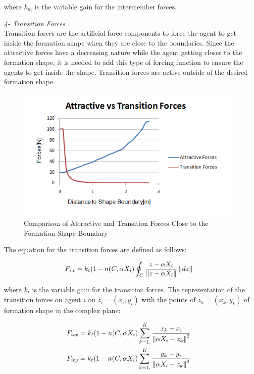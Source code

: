 where $k_m$ is the variable gain for the intermember forces.  \newline
			
\textit{4- Transition Forces} \\ 		
Transition forces are the artificial force components to force the agent to get inside the formation shape when they are close to the boundaries. Since the attractive forces have a decreasing nature while the agent getting closer to the formation shape, it is needed to add this type of forcing function to ensure the agents to get inside the shape. Transition forces are active outside of the desired formation shape.
			
\begin{figure}[H]
\caption{Comparison of Attractive and Transition Forces Close to the Formation Shape Boundary}
\centering
\includegraphics[scale = 0.80]{transition_forces}
\end{figure}		

The equation for the transition forces are defined as follows:	
				
\begin{equation}
F_{i,t} = k_t (1-n(C,\alpha X_i) \oint_C \frac{z-\alpha X_i}{\left\lVert z-\alpha X_i\right\rVert}\left\lVert dz\right\rVert
\end{equation}
				
where $k_t$ is the variable gain for the transition forces. The representation of the transition forces on agent $i$ on $z_i = (x_i, y_i)$ with the points of  $z_k = (x_k,y_k)$ of formation shape in the complex plane:
			
\begin{align}
\begin{split}
&F_{itx} = k_t  (1-n(C,\alpha X_i) \sum_{k=1,}^{K}\frac{x_k- x_i}{\left\lVert\alpha X_i - z_k\right\rVert^3}\\
&F_{ity} = k_t  (1-n(C,\alpha X_i) \sum_{k=1,}^{K}\frac{y_k- y_i}{\left\lVert\alpha X_i - z_k\right\rVert^3}\\
\end{split}
\end{align}
			

